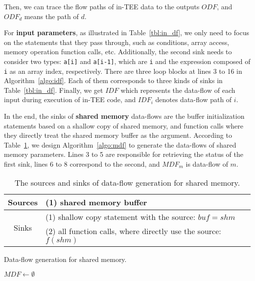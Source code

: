 Then, we can trace the flow paths of in-TEE data to the outputs $ODF$, and $ODF_d$ means the path of $d$.

For \textbf{input parameters}, as illustrated in Table~\ref{tbl:in_df}, we only need to focus on the statements that they pass through, such as conditions, array access, memory operation function calls, etc. 
Additionally, the second sink needs to consider two types: \texttt{a[i]} and \texttt{a[i-1]}, which are \texttt{i} and the expression composed of \texttt{i} as an array index, respectively.
There are three loop blocks at lines 3 to 16 in Algorithm~\ref{algo:idf}. Each of them corresponds to three kinds of sinks in Table~\ref{tbl:in_df}. Finally, we get $IDF$ which represents the data-flow of each input during execution of in-TEE code, and $IDF_i$ denotes data-flow path of $i$.

In the end, the sinks of \textbf{shared memory} data-flows are the buffer initialization statements based on a shallow copy of shared memory, and function calls where they directly treat the shared memory buffer as the argument. According to Table~\ref{tbl:shm}, we design Algorithm~\ref{algo:mdf} to generate the data-flows of shared memory parameters. Lines 3 to 5 are responsible for retrieving the status of the first sink, lines 6 to 8 correspond to the second, and $MDF_m$ is data-flow of $m$.

\begin{table}[t]
    \caption{The sources and sinks of data-flow generation for shared memory.}
    \label{tbl:shm}
    \centering
	\begin{tabular}{cp{11cm}}
		\toprule
            Sources & (1) shared memory buffer\\
            \midrule
            \multirow{2}{*}{Sinks} & (1) shallow copy statement with the source: $buf=shm$\\
             & (2) all function calls, where directly use the source: $f(shm)$\\
		\bottomrule
	\end{tabular}
\end{table}

\begin{algorithm}[t]
\caption{Data-flow generation for shared memory.}
\label{algo:mdf}
$MDF \gets \emptyset$\;
\end{algorithm}

